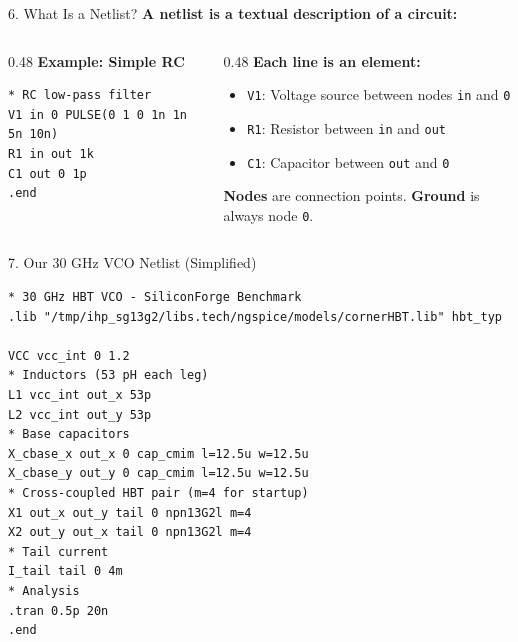 \documentclass[aspectratio=169, 11pt]{beamer}
\begin{document}
\begin{frame}{6. What Is a Netlist?}
    \textbf{A netlist is a textual description of a circuit:}

    \vspace{0.5em}
    \begin{columns}[T]
        \begin{column}{0.48\textwidth}
            \textbf{Example: Simple RC}
            \begin{lstlisting}[language=SPICE]
* RC low-pass filter
V1 in 0 PULSE(0 1 0 1n 1n 5n 10n)
R1 in out 1k
C1 out 0 1p
.end
            \end{lstlisting}
        \end{column}
        \begin{column}{0.48\textwidth}
            \textbf{Each line is an element:}
            \begin{itemize}
                \item \texttt{V1}: Voltage source between nodes \texttt{in} and \texttt{0}
                \item \texttt{R1}: Resistor between \texttt{in} and \texttt{out}
                \item \texttt{C1}: Capacitor between \texttt{out} and \texttt{0}
            \end{itemize}
            \vspace{0.3em}
            \textbf{Nodes} are connection points.
            \textbf{Ground} is always node \texttt{0}.
        \end{column}
    \end{columns}
\end{frame}

\begin{frame}{7. Our 30 GHz VCO Netlist (Simplified)}
    \begin{lstlisting}[language=SPICE, basicstyle=\ttfamily\tiny]
* 30 GHz HBT VCO - SiliconForge Benchmark
.lib "/tmp/ihp_sg13g2/libs.tech/ngspice/models/cornerHBT.lib" hbt_typ

VCC vcc_int 0 1.2
* Inductors (53 pH each leg)
L1 vcc_int out_x 53p
L2 vcc_int out_y 53p
* Base capacitors
X_cbase_x out_x 0 cap_cmim l=12.5u w=12.5u
X_cbase_y out_y 0 cap_cmim l=12.5u w=12.5u
* Cross-coupled HBT pair (m=4 for startup)
X1 out_x out_y tail 0 npn13G2l m=4
X2 out_y out_x tail 0 npn13G2l m=4
* Tail current
I_tail tail 0 4m
* Analysis
.tran 0.5p 20n
.end
    \end{lstlisting}
\end{frame}
\end{document}
